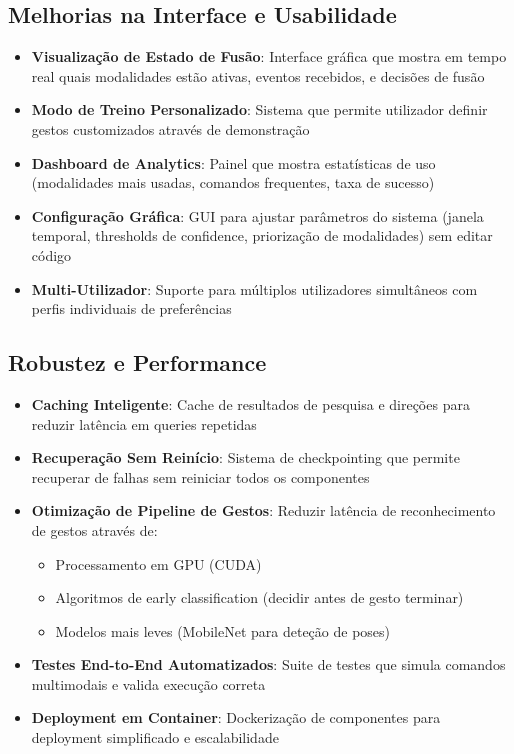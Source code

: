 \subsection{Melhorias na Interface e Usabilidade}

\begin{itemize}
    \item \textbf{Visualização de Estado de Fusão}: Interface gráfica que mostra em tempo real quais modalidades estão ativas, eventos recebidos, e decisões de fusão

    \item \textbf{Modo de Treino Personalizado}: Sistema que permite utilizador definir gestos customizados através de demonstração

    \item \textbf{Dashboard de Analytics}: Painel que mostra estatísticas de uso (modalidades mais usadas, comandos frequentes, taxa de sucesso)

    \item \textbf{Configuração Gráfica}: GUI para ajustar parâmetros do sistema (janela temporal, thresholds de confidence, priorização de modalidades) sem editar código

    \item \textbf{Multi-Utilizador}: Suporte para múltiplos utilizadores simultâneos com perfis individuais de preferências
\end{itemize}

\subsection{Robustez e Performance}

\begin{itemize}
    \item \textbf{Caching Inteligente}: Cache de resultados de pesquisa e direções para reduzir latência em queries repetidas

    \item \textbf{Recuperação Sem Reinício}: Sistema de checkpointing que permite recuperar de falhas sem reiniciar todos os componentes

    \item \textbf{Otimização de Pipeline de Gestos}: Reduzir latência de reconhecimento de gestos através de:
    \begin{itemize}
        \item Processamento em GPU (CUDA)
        \item Algoritmos de early classification (decidir antes de gesto terminar)
        \item Modelos mais leves (MobileNet para deteção de poses)
    \end{itemize}

    \item \textbf{Testes End-to-End Automatizados}: Suite de testes que simula comandos multimodais e valida execução correta

    \item \textbf{Deployment em Container}: Dockerização de componentes para deployment simplificado e escalabilidade
\end{itemize}

